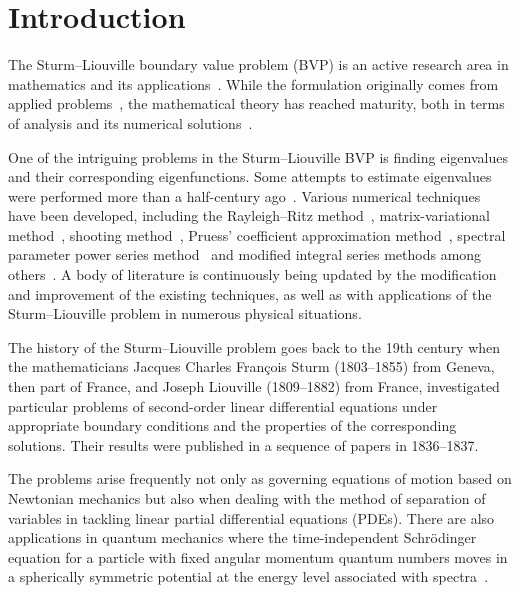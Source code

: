 \documentclass[symmetry,article,accept,moreauthors,pdftex,a4paper]{mdpi}
\begin{document}
\section{Introduction}

The Sturm--Liouville boundary value problem (BVP) is an active research area in mathematics and its applications~\cite{kravchenko2020direct,zettl2021recent}. While the formulation originally comes from applied problems~\cite{gwaiz2008sturm,haberman2013applied}, the mathematical theory has reached maturity, both in terms of analysis {and} its numerical solutions~\cite{teschl2021ordinary,zettl2010sturm,amerin2005sturm,pryce1993numerical,bailey2001sleighn2}. 

One of the intriguing problems in the Sturm--Liouville BVP is finding eigenvalues and their corresponding eigenfunctions. Some attempts to estimate eigenvalues were performed more than a half-century ago~\cite{hochstadt1961,pruess1973estimating}. Various numerical techniques have been developed, including the Rayleigh--Ritz method~\cite{trefethen1997numerical}, matrix-variational method~\cite{gerck1982solution}, shooting method~\cite{ledoux2009efficient}, Pruess' coefficient approximation method~\cite{pruess1975high}, spectral parameter power series method~\cite{kravchenko2010spectral} and modified integral series methods among others~\cite{moan1988efficient}. A body of literature is continuously being updated by the modification and improvement of the existing techniques, as well as with applications of the Sturm--Liouville problem in numerous physical situations.

The history of the Sturm--Liouville problem goes back to the 19th century when the mathematicians Jacques Charles Fran\c{c}ois Sturm (1803--1855) from Geneva, then part of France, and Joseph Liouville (1809--1882) from France, investigated particular problems of second-order linear differential equations under appropriate boundary conditions and the properties of the corresponding solutions. Their results were published in a sequence of papers in 1836--1837. 

The problems arise frequently not only as governing equations of motion based on Newtonian mechanics but also when dealing with the method of separation of variables in tackling linear partial differential equations (PDEs). There are also applications in quantum mechanics where the time-independent Schr\"odinger equation for a particle with fixed angular momentum quantum numbers moves in a spherically symmetric potential at the energy level associated with spectra~\cite{prugovecki1981quantum,newton2013scattering}.
\end{document}
